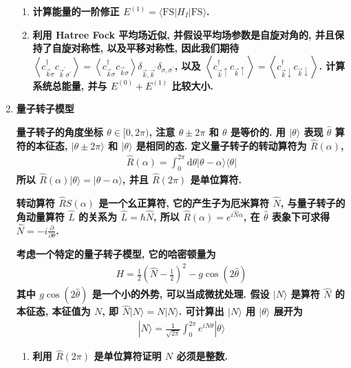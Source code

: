 \documentclass[../../main.tex]{subfiles}
\begin{document}
\begin{enumerate}
\begin{enumerate}
    \item \textbf{计算能量的一阶修正 $E^{(1)} = \langle\text{FS}|H_{I}|\text{FS}\rangle$.}
    
    \item \textbf{利用 Hatree Fock 平均场近似, 并假设平均场参数是自旋对角的, 并且保持了自旋对称性, 以及平移对称性, 因此我们期待 $\left\langle c_{\vec{k}\sigma}^{\dagger}c_{\vec{k}^{\prime}\sigma^{\prime}}\right\rangle = \left\langle c_{\vec{k}\sigma}^{\dagger}c_{\vec{k}\sigma}\right\rangle\delta_{\vec{k},\vec{k}^{\prime}}\delta_{\sigma,\sigma^{\prime}}$, 以及 $\left\langle c_{\vec{k}\uparrow}^{\dagger}c_{\vec{k}\uparrow}\right\rangle = \left\langle c_{\vec{k}\downarrow}^{\dagger}c_{\vec{k}\downarrow}\right\rangle$. 计算系统总能量, 并与 $E^{(0)} + E^{(1)}$ 比较大小.}
  \end{enumerate}

  \item \textbf{量子转子模型}
  
  \textbf{量子转子的角度坐标 $\theta\in[0,2\pi)$, 注意 $\theta\pm 2\pi$ 和 $\theta$ 是等价的. 用 $|\theta\rangle$ 表现 $\hat{\theta}$ 算符的本征态, $|\theta\pm 2\pi\rangle$ 和 $|\theta\rangle$ 是相同的态. 定义量子转子的转动算符为 $\hat{R}(\alpha)$, 
  \begin{align*}
    \hat{R}(\alpha) = \int_{0}^{2\pi}\mathrm{d}\theta |\theta - \alpha\rangle\langle\theta|
  \end{align*}
  所以 $\hat{R}(\alpha)|\theta\rangle = |\theta - \alpha\rangle$, 并且 $\hat{R}(2\pi)$ 是单位算符.}

  \textbf{转动算符 $\hat{R}S(\alpha)$ 是一个幺正算符, 它的产生子为厄米算符 $\hat{N}$, 与量子转子的角动量算符 $\hat{L}$ 的关系为 $\hat{L} = \hbar\hat{N}$, 所以 $\hat{R}(\alpha) = e^{i\hat{N}\alpha}$, 在 $\hat{\theta}$ 表象下可求得 $\hat{N} = -i\frac{\partial}{\partial\theta}$. }

  \textbf{考虑一个特定的量子转子模型, 它的哈密顿量为
  \begin{align*}
    H = \frac{1}{2}\left(\hat{N} - \frac{1}{2}\right)^{2} - g\cos{\left(2\hat{\theta}\right)}
  \end{align*}
  其中 $g\cos{\left(2\hat{\theta}\right)}$ 是一个小的外势, 可以当成微扰处理. 假设 $|N\rangle$ 是算符 $\hat{N}$ 的本征态, 本征值为 $N$, 即 $\hat{N}|N\rangle = N|N\rangle$. 可计算出 $|N\rangle$ 用 $|\theta\rangle$ 展开为
  \begin{align*}
    |N\rangle = \frac{1}{\sqrt{2\pi}}\int_{0}^{2\pi}e^{iN\theta}|\theta\rangle
  \end{align*}}
  \begin{enumerate}
    \item \textbf{利用 $\hat{R}(2\pi)$ 是单位算符证明 $N$ 必须是整数.}
    

\end{enumerate}
\end{enumerate}
\end{document}
